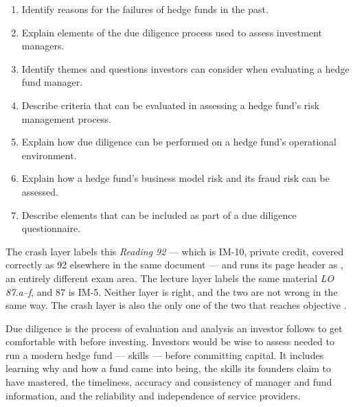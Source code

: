 

\begin{imkeybox}[title={The seven objectives in this reading}]
\begin{enumerate}[label=\textbf{\alph*.}]
\item Identify reasons for the failures of hedge funds in the past.
\item Explain elements of the due diligence process used to assess investment managers.
\item Identify themes and questions investors can consider when evaluating a hedge fund manager.
\item Describe criteria that can be evaluated in assessing a hedge fund's risk management process.
\item Explain how due diligence can be performed on a hedge fund's operational environment.
\item Explain how a hedge fund's business model risk and its fraud risk can be assessed.
\item Describe elements that can be included as part of a due diligence questionnaire.
\end{enumerate}
\end{imkeybox}

\begin{imtrapbox}[breakable=false,title={Two layers, two wrong reading numbers, and a wrong area}]
The crash layer labels this \emph{Reading 92} --- which is IM-10, private credit,
covered correctly as 92 elsewhere in the same document --- and runs its page
header as , an entirely different
exam area. The lecture layer labels the same material \emph{LO 87.a--f}, and 87 is
IM-5. Neither layer is right, and the two are not wrong in the same way. The
crash layer is also the only one of the two that reaches objective .
\end{imtrapbox}


Due diligence is the process of evaluation and analysis an investor follows to get
comfortable with  before investing.
Investors would be wise to assess  needed to run a
modern hedge fund ---  skills ---
before committing capital. It includes learning why and how a fund came into
being, the skills its founders claim to have mastered, the timeliness, accuracy
and consistency of manager and fund information, and the reliability and
independence of service providers.

